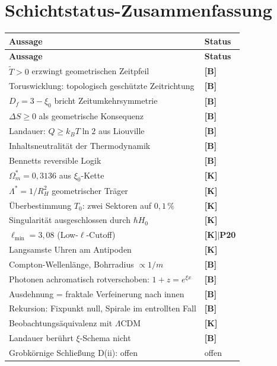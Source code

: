 \section{Schichtstatus-Zusammenfassung}

\begin{center}
\small
\begin{longtable}{@{}p{}l@{}}
\toprule
\textbf{Aussage} & \textbf{Status} \\
\midrule
\endfirsthead
\toprule
\textbf{Aussage} & \textbf{Status} \\
\midrule
\endhead
$\tilde{T} > 0$ erzwingt geometrischen Zeitpfeil & \textbf{[B]} \\
Toruswicklung: topologisch geschützte Zeitrichtung & \textbf{[B]} \\
$D_f = 3-\xi_0$ bricht Zeitumkehrsymmetrie & \textbf{[B]} \\
$\Delta S \ge 0$ als geometrische Konsequenz & \textbf{[B]} \\
Landauer: $Q \ge k_BT\ln 2$ aus Liouville & \textbf{[B]} \\
Inhaltsneutralität der Thermodynamik & \textbf{[B]} \\
Bennetts reversible Logik & \textbf{[B]} \\
$\Omega_m^* = 0{,}3136$ aus $\xi_0$-Kette & \textbf{[K]} \\
$\Lambda^* = 1/R_H^2$ geometrischer Träger & \textbf{[K]} \\
Überbestimmung $T_0$: zwei Sektoren auf $0{,}1\,\%$ & \textbf{[K]} \\
Singularität ausgeschlossen durch $\hbar H_0$ & \textbf{[K]} \\
$\ell_\text{min} = 3{,}08$ (Low-$\ell$-Cutoff) & \textbf{[K]$|$P20} \\
Langsamste Uhren am Antipoden & \textbf{[K]} \\
Compton-Wellenlänge, Bohrradius $\propto 1/m$ & \textbf{[B]} \\
Photonen achromatisch rotverschoben: $1+z = e^{\xi x}$ & \textbf{[B]} \\
Ausdehnung = fraktale Verfeinerung nach innen & \textbf{[B]} \\
Rekursion: Fixpunkt null, Spirale im entrollten Fall & \textbf{[B]} \\
Beobachtungsäquivalenz mit $\Lambda$CDM & \textbf{[K]} \\
Landauer berührt $\xi$-Schema nicht & \textbf{[B]} \\
Grobkörnige Schließung D(ii): offen & offen \\

\end{longtable}
\end{center}
